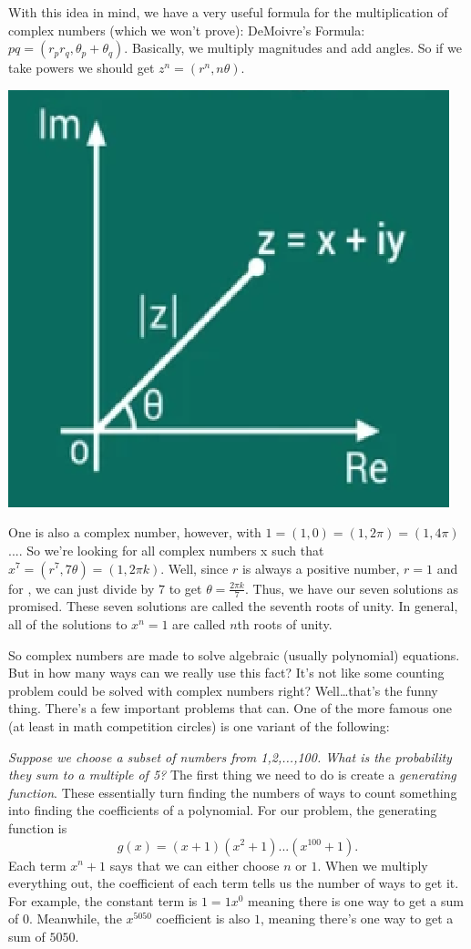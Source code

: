 \documentclass{article}
\begin{document}
With this idea in mind, we have a very useful formula for the multiplication of complex numbers (which we won’t prove): DeMoivre’s Formula: $pq=(r_pr_q,\theta_p+\theta_q)$. Basically, we multiply magnitudes and add angles. So if we take powers we should get $z^n=(r^n,n\theta)$. 
\begin{center}
\includegraphics[scale=0.8]{images/complex1.png}
\end{center}
One is also a complex number, however, with $1=(1,0)=(1,2\pi)=(1,4\pi)$.... So we’re looking for all complex numbers x such that $x^7=(r^7,7\theta)=(1,2\pi k)$. Well, since $r$ is always a positive number, $r=1$ and for , we can just divide by $7$ to get $\theta=\frac{2\pi k}{7}$. Thus, we have our seven solutions as promised. These seven solutions are called the seventh roots of unity. In general, all of the solutions to $x^n=1$ are called $n$th roots of unity. 

So complex numbers are made to solve algebraic (usually polynomial) equations. But in how many ways can we really use this fact? It’s not like some counting problem could be solved with complex numbers right? Well…that’s the funny thing. There’s a few important problems that can. One of the more famous one (at least in math competition circles) is one variant of the following:

\textit{Suppose we choose a subset of numbers from {1,2,...,100}. What is the probability they sum to a multiple of 5?} The first thing we need to do is create a \textit{generating function}. These essentially turn finding the numbers of ways to count something into finding the coefficients of a polynomial. For our problem, the generating function is 
$$g(x)=(x+1)(x^2+1)...(x^{100}+1).$$ 
Each term $x^n+1$ says that we can either choose $n$ or $1$. When we multiply everything out, the coefficient of each term tells us the number of ways to get it. For example, the constant term is $1=1x^0$ meaning there is one way to get a sum of $0$. Meanwhile, the $x^{5050}$ coefficient is also $1$, meaning there’s one way to get a sum of $5050$. 
\end{document}
